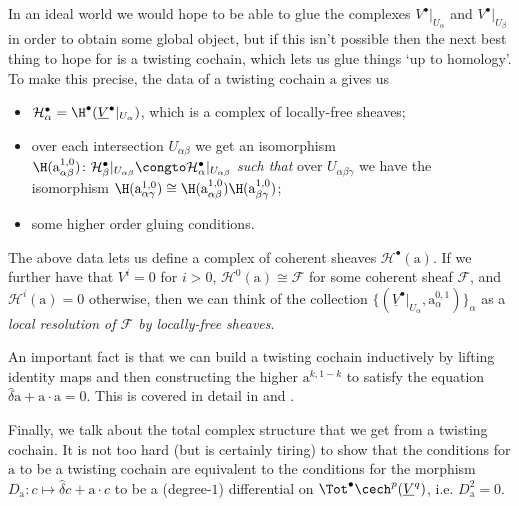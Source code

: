         In an ideal world we would hope to be able to glue the complexes $V^\bullet|_{U_\alpha}$ and $V^\bullet|_{U_\beta}$ in order to obtain some global object, but if this isn't possible then the next best thing to hope for is a twisting cochain, which lets us glue things `up to homology'.
        To make this precise, the data of a twisting cochain $\mathrm{a}$ gives us
        \begin{itemize}
            \item $\mathcal{H}^\bullet_\alpha=\H^\bullet(\underline{V}^\bullet|_{U_\alpha})$, which is a complex of locally-free sheaves;
            \item over each intersection $U_{\alpha\beta}$ we get an isomorphism $\H(\mathrm{a}^{1,0}_{\alpha\beta})\colon\mathcal{H}^\bullet_\beta|_{U_{\alpha\beta}}\congto\mathcal{H}^\bullet_\alpha|_{U_{\alpha\beta}}$ \textit{such that} over $U_{\alpha\beta\gamma}$ we have the isomorphism $\H(\mathrm{a}^{1,0}_{\alpha\gamma})\cong\H(\mathrm{a}^{1,0}_{\alpha\beta})\H(\mathrm{a}^{1,0}_{\beta\gamma})$;
            \item some higher order gluing conditions.
        \end{itemize}

        The above data lets us define a complex of coherent sheaves $\mathcal{H}^\bullet(\mathrm{a})$.
        If we further have that $V^i=0$ for $i>0$, $\mathcal{H}^0(\mathrm{a})\cong\mathcal{F}$ for some coherent sheaf $\mathcal{F}$, and $\mathcal{H}^i(\mathrm{a})=0$ otherwise, then we can think of the collection $\{(\underline{V}^\bullet|_{U_\alpha},\mathrm{a}^{0,1}_\alpha)\}_{\alpha}$ as a \textit{local resolution of $\mathcal{F}$ by locally-free sheaves}.

        \begin{note}
            An important fact is that we can build a twisting cochain inductively by lifting identity maps and then constructing the higher $\mathrm{a}^{k,1-k}$ to satisfy the equation $\hat{\delta}\mathrm{a}+\mathrm{a}\cdot\mathrm{a}=0$.
            This is covered in detail in \cite[p.~230]{OBrian:1981vs} and \cite[Lemma~8.13]{Toledo:1976gy}.
        \end{note}

        Finally, we talk about the total complex structure that we get from a twisting cochain.
        It is not too hard (but is certainly tiring) to show that the conditions for $\mathrm{a}$ to be a twisting cochain are equivalent to the conditions for the morphism $D_\mathrm{a}\colon c\mapsto\hat{\delta}c+\mathrm{a}\cdot c$ to be a (\mbox{degree-$1$}) differential on $\Tot^\bullet\cech^p(\underline{V}^q)$, i.e. $D_\mathrm{a}^2=0$.

